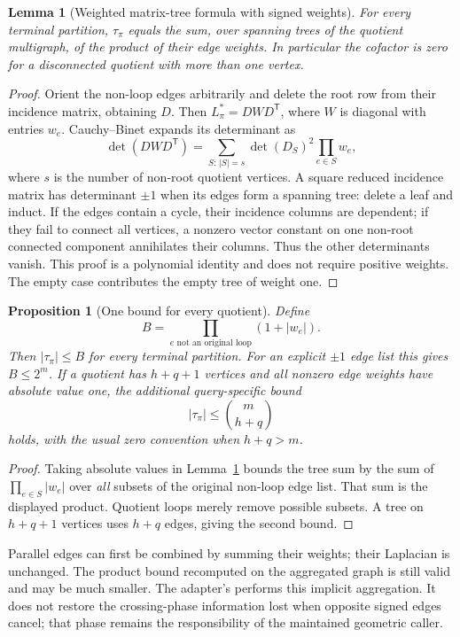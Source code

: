 \documentclass[11pt,letterpaper]{article}
\newtheorem{lemma}[theorem]{Lemma}
\newtheorem{proposition}[theorem]{Proposition}
\theoremstyle{definition}\newtheorem{definition}[theorem]{Definition}
\theoremstyle{remark}\newtheorem{remark}[theorem]{Remark}
\newcommand{\code}[1]{\texttt{\detokenize{#1}}}
\newcommand{\trans}{^{\mathsf T}}
\begin{document}
\begin{lemma}[Weighted matrix-tree formula with signed weights]
\label{lem:tree}
For every terminal partition, $\tau_\pi$ equals the sum, over spanning trees of the quotient multigraph, of the product of their edge weights. In particular the cofactor is zero for a disconnected quotient with more than one vertex.
\end{lemma}
\begin{proof}
Orient the non-loop edges arbitrarily and delete the root row from their incidence matrix, obtaining $D$. Then $L_\pi^*=DWD\trans$, where $W$ is diagonal with entries $w_e$. Cauchy--Binet expands its determinant as
\[
 \det(DWD\trans)=\sum_{S:\,|S|=s}\det(D_S)^2\prod_{e\in S}w_e,
\]
where $s$ is the number of non-root quotient vertices. A square reduced incidence matrix has determinant $\pm1$ when its edges form a spanning tree: delete a leaf and induct. If the edges contain a cycle, their incidence columns are dependent; if they fail to connect all vertices, a nonzero vector constant on one non-root connected component annihilates their columns. Thus the other determinants vanish. This proof is a polynomial identity and does not require positive weights. The empty case contributes the empty tree of weight one.
\end{proof}

\begin{proposition}[One bound for every quotient]
\label{prop:bound}
Define
\[
 B=\prod_{e\text{ not an original loop}}(1+|w_e|).
\]
Then $|\tau_\pi|\leq B$ for every terminal partition. For an explicit $\pm1$ edge list this gives $B\leq2^m$. If a quotient has $h+q+1$ vertices and all nonzero edge weights have absolute value one, the additional query-specific bound
\[
 |\tau_\pi|\leq\binom{m}{h+q}
\]
holds, with the usual zero convention when $h+q>m$.
\end{proposition}
\begin{proof}
Taking absolute values in Lemma~\ref{lem:tree} bounds the tree sum by the sum of $\prod_{e\in S}|w_e|$ over \emph{all} subsets of the original non-loop edge list. That sum is the displayed product. Quotient loops merely remove possible subsets. A tree on $h+q+1$ vertices uses $h+q$ edges, giving the second bound.
\end{proof}

Parallel edges can first be combined by summing their weights; their Laplacian is unchanged. The product bound recomputed on the aggregated graph is still valid and may be much smaller. The adapter's \code{SignedGraph.from_laplacian} performs this implicit aggregation. It does not restore the crossing-phase information lost when opposite signed edges cancel; that phase remains the responsibility of the maintained geometric caller.
\end{document}
